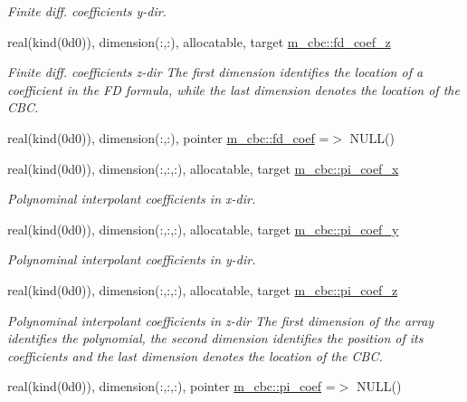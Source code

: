 \begin{DoxyCompactItemize}
\begin{DoxyCompactList}\small\item\em Finite diff. coefficients y-\/dir. \end{DoxyCompactList}\item 
real(kind(0d0)), dimension(\+:,\+:), allocatable, target \hyperlink{namespacem__cbc_a025a2f672d7d9997966bdedab3f333de}{m\+\_\+cbc\+::fd\+\_\+coef\+\_\+z}
\begin{DoxyCompactList}\small\item\em Finite diff. coefficients z-\/dir The first dimension identifies the location of a coefficient in the FD formula, while the last dimension denotes the location of the C\+BC. \end{DoxyCompactList}\item 
real(kind(0d0)), dimension(\+:,\+:), pointer \hyperlink{namespacem__cbc_a5950f5d9fbc613591a42a3f9587f32f5}{m\+\_\+cbc\+::fd\+\_\+coef} =$>$ N\+U\+LL()
\item 
real(kind(0d0)), dimension(\+:,\+:,\+:), allocatable, target \hyperlink{namespacem__cbc_a906043af9a1ee38feda508ccb40c5402}{m\+\_\+cbc\+::pi\+\_\+coef\+\_\+x}
\begin{DoxyCompactList}\small\item\em Polynominal interpolant coefficients in x-\/dir. \end{DoxyCompactList}\item 
real(kind(0d0)), dimension(\+:,\+:,\+:), allocatable, target \hyperlink{namespacem__cbc_a54a6e22ead2511305b7370369f46af7a}{m\+\_\+cbc\+::pi\+\_\+coef\+\_\+y}
\begin{DoxyCompactList}\small\item\em Polynominal interpolant coefficients in y-\/dir. \end{DoxyCompactList}\item 
real(kind(0d0)), dimension(\+:,\+:,\+:), allocatable, target \hyperlink{namespacem__cbc_af820095dcf800b727c19f2b5ee95a814}{m\+\_\+cbc\+::pi\+\_\+coef\+\_\+z}
\begin{DoxyCompactList}\small\item\em Polynominal interpolant coefficients in z-\/dir The first dimension of the array identifies the polynomial, the second dimension identifies the position of its coefficients and the last dimension denotes the location of the C\+BC. \end{DoxyCompactList}\item 
real(kind(0d0)), dimension(\+:,\+:,\+:), pointer \hyperlink{namespacem__cbc_ace0392bdc9bb94c00e11d4e51432e0ad}{m\+\_\+cbc\+::pi\+\_\+coef} =$>$ N\+U\+LL()

\end{DoxyCompactItemize}
